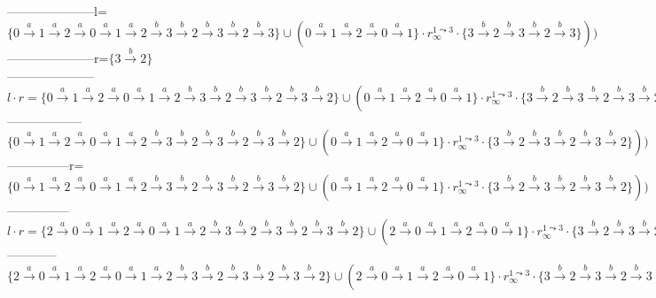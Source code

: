 {---------------------l=$\{0 \xrightarrow{a} 1 \xrightarrow{a} 2 \xrightarrow{a} 0 \xrightarrow{a} 1 \xrightarrow{a} 2 \xrightarrow{b} 3 \xrightarrow{b} 2 \xrightarrow{b} 3 \xrightarrow{b} 2 \xrightarrow{b} 3\} \cup (0 \xrightarrow{a} 1 \xrightarrow{a} 2 \xrightarrow{a} 0 \xrightarrow{a} 1\} \cdot r_\infty^{1\leadsto 3} \cdot \{3 \xrightarrow{b} 2 \xrightarrow{b} 3 \xrightarrow{b} 2 \xrightarrow{b} 3\}))$\\
---------------------r=$\{3 \xrightarrow{b} 2\}$\\
---------------------$l\cdot r = \{0 \xrightarrow{a} 1 \xrightarrow{a} 2 \xrightarrow{a} 0 \xrightarrow{a} 1 \xrightarrow{a} 2 \xrightarrow{b} 3 \xrightarrow{b} 2 \xrightarrow{b} 3 \xrightarrow{b} 2 \xrightarrow{b} 3 \xrightarrow{b} 2\} \cup (0 \xrightarrow{a} 1 \xrightarrow{a} 2 \xrightarrow{a} 0 \xrightarrow{a} 1\} \cdot r_\infty^{1\leadsto 3} \cdot \{3 \xrightarrow{b} 2 \xrightarrow{b} 3 \xrightarrow{b} 2 \xrightarrow{b} 3 \xrightarrow{b} 2\}))$\\
------------------$\{0 \xrightarrow{a} 1 \xrightarrow{a} 2 \xrightarrow{a} 0 \xrightarrow{a} 1 \xrightarrow{a} 2 \xrightarrow{b} 3 \xrightarrow{b} 2 \xrightarrow{b} 3 \xrightarrow{b} 2 \xrightarrow{b} 3 \xrightarrow{b} 2\} \cup (0 \xrightarrow{a} 1 \xrightarrow{a} 2 \xrightarrow{a} 0 \xrightarrow{a} 1\} \cdot r_\infty^{1\leadsto 3} \cdot \{3 \xrightarrow{b} 2 \xrightarrow{b} 3 \xrightarrow{b} 2 \xrightarrow{b} 3 \xrightarrow{b} 2\}))$\\
---------------r=$\{0 \xrightarrow{a} 1 \xrightarrow{a} 2 \xrightarrow{a} 0 \xrightarrow{a} 1 \xrightarrow{a} 2 \xrightarrow{b} 3 \xrightarrow{b} 2 \xrightarrow{b} 3 \xrightarrow{b} 2 \xrightarrow{b} 3 \xrightarrow{b} 2\} \cup (0 \xrightarrow{a} 1 \xrightarrow{a} 2 \xrightarrow{a} 0 \xrightarrow{a} 1\} \cdot r_\infty^{1\leadsto 3} \cdot \{3 \xrightarrow{b} 2 \xrightarrow{b} 3 \xrightarrow{b} 2 \xrightarrow{b} 3 \xrightarrow{b} 2\}))$\\
---------------$l \cdot r = \{2 \xrightarrow{a} 0 \xrightarrow{a} 1 \xrightarrow{a} 2 \xrightarrow{a} 0 \xrightarrow{a} 1 \xrightarrow{a} 2 \xrightarrow{b} 3 \xrightarrow{b} 2 \xrightarrow{b} 3 \xrightarrow{b} 2 \xrightarrow{b} 3 \xrightarrow{b} 2\} \cup (2 \xrightarrow{a}  0 \xrightarrow{a} 1 \xrightarrow{a} 2 \xrightarrow{a} 0 \xrightarrow{a} 1\} \cdot r_\infty^{1\leadsto 3} \cdot \{3 \xrightarrow{b} 2 \xrightarrow{b} 3 \xrightarrow{b} 2 \xrightarrow{b} 3 \xrightarrow{b} 2\}))$\\
------------$\{2 \xrightarrow{a} 0 \xrightarrow{a} 1 \xrightarrow{a} 2 \xrightarrow{a} 0 \xrightarrow{a} 1 \xrightarrow{a} 2 \xrightarrow{b} 3 \xrightarrow{b} 2 \xrightarrow{b} 3 \xrightarrow{b} 2 \xrightarrow{b} 3 \xrightarrow{b} 2\} \cup (2 \xrightarrow{a}  0 \xrightarrow{a} 1 \xrightarrow{a} 2 \xrightarrow{a} 0 \xrightarrow{a} 1\} \cdot r_\infty^{1\leadsto 3} \cdot \{3 \xrightarrow{b} 2 \xrightarrow{b} 3 \xrightarrow{b} 2 \xrightarrow{b} 3 \xrightarrow{b} 2\}))$\\
}
